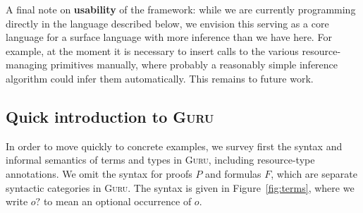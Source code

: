 \documentclass[9pt,natbib]{sigplanconf}
\begin{document}
A final note on \textbf{usability} of the framework: while we are
currently programming directly in the language described below, we
envision this serving as a core language for a surface language with
more inference than we have here.  For example, at the moment it is
necessary to insert calls to the various resource-managing primitives
manually, where probably a reasonably simple inference algorithm could
infer them automatically.  This remains to future work.

\subsection{Quick introduction to \textsc{Guru}}
\label{sec:guru}

In order to move quickly to concrete examples, we survey first the
syntax and informal semantics of terms and types in \textsc{Guru},
including resource-type annotations.  We omit the syntax for proofs
$P$ and formulas $F$, which are separate syntactic categories in
\textsc{Guru}.  The syntax is given in Figure~\ref{fig:terms}, where
we write $o?$ to mean an optional occurrence of $o$.
\end{document}
